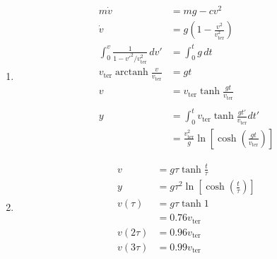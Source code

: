 \documentclass{article}
\newcommand{\arctanh}{\operatorname{arctanh}}
\begin{document}
\begin{enumerate}
  \item

        \begin{align*}
          m \dot{v}                                           & = m g - c v^2                                                                               \\
          \dot{v}                                             & = g \left( 1 - \frac{v^2}{v_\text{ter}^2} \right)                                           \\
          \int_0^v \frac{1}{1 - v'^2 / v_\text{ter}^2} \,d v' & = \int_0^t g \,d t                                                                          \\
          v_\text{ter} \arctanh \frac{v}{v_\text{ter}}        & = g t                                                                                       \\
          v                                                   & = v_\text{ter} \tanh \frac{g t}{v_\text{ter}}                                               \\ \\
          y                                                   & = \int_0^t v_\text{ter} \tanh \frac{g t'}{v_\text{ter}} d t'                                \\
                                                              & = \frac{v_\text{ter}^2}{g} \ln \left[ \cosh \left( \frac{g t}{v_\text{ter}} \right) \right]
        \end{align*}

  \item

        \begin{align*}
          v         & = g \tau \tanh \frac{t}{\tau}                                     \\
          y         & = g \tau^2 \ln \left[ \cosh \left( \frac{t}{\tau} \right) \right] \\
          v(\tau)   & = g \tau \tanh 1                                                  \\
                    & = 0.76 v_\text{ter}                                               \\
          v(2 \tau) & = 0.96 v_\text{ter}                                               \\
          v(3 \tau) & = 0.99 v_\text{ter}
        \end{align*}


\end{enumerate}
\end{document}
